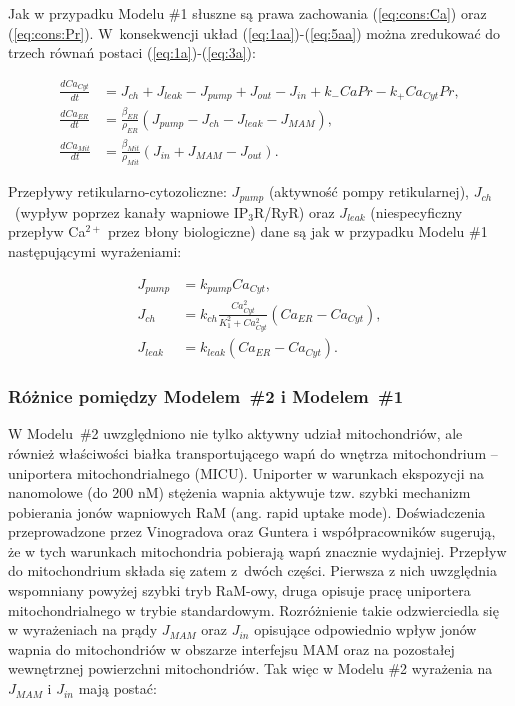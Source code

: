 Jak w przypadku Modelu \#1 słuszne są prawa zachowania 
(\ref{eq:cons:Ca}) oraz (\ref{eq:cons:Pr}). 
W~konsekwencji układ (\ref{eq:1aa})-(\ref{eq:5aa}) można zredukować 
do trzech równań postaci (\ref{eq:1a})-(\ref{eq:3a}): 

\begin{align}
\frac{dCa_{Cyt}}{dt}&=J_{ch}+J_{leak}-J_{pump}+J_{out}-J_{in}
			+k_-CaPr-k_+Ca_{Cyt}Pr, \label{eq:11}\\
\frac{dCa_{ER}}{dt}&=\frac{\beta_{ER}}{\rho_{ER}}\left(J_{pump}-J_{ch}
			-J_{leak} -J_{MAM}\right), \label{eq:22}\\
\frac{dCa_{Mit}}{dt}&=\frac{\beta_{Mit}}{\rho_{Mit}}\left(J_{in}+J_{MAM}
			-J_{out}\right). \label{eq:33}
\end{align}



Przepływy retikularno-cytozoliczne: $J_{pump}$ (aktywność pompy retikularnej), $J_{ch}$~(wypływ poprzez kanały wapniowe IP$_3$R/RyR) oraz $J_{leak}$ (niespecyficzny przepływ Ca$^{2+}$ przez błony biologiczne) dane są jak w przypadku Modelu \#1 następującymi wyrażeniami:

\begin{align}
J_{pump}& = k_{pump}Ca_{Cyt},\\
J_{ch}& = k_{ch}\frac{Ca_{Cyt}^2}{K_1^2+Ca_{Cyt}^2}
											\left(Ca_{ER}-Ca_{Cyt}\right),\label{eq:jch}\\
J_{leak}& = k_{leak}\left(Ca_{ER}-Ca_{Cyt}\right).
\end{align}


\subsubsection*{Różnice pomiędzy Modelem~\#2 i Modelem~\#1}
\label{ss:roznice}

W Modelu~\#2 uwzględniono nie tylko aktywny udział mitochondriów, ale również właściwości białka transportującego wapń do wnętrza mitochondrium – uniportera mitochondrialnego (MICU). Uniporter w warunkach ekspozycji na nanomolowe (do 200 nM) stężenia wapnia aktywuje tzw. szybki mechanizm pobierania jonów wapniowych RaM (ang. rapid uptake mode). Doświadczenia przeprowadzone przez Vinogradova \cite{Vinogradov1973} oraz Guntera i współpracowników \cite{Gunter2001,Sparagna1995} sugerują, że w tych warunkach mitochondria pobierają wapń znacznie wydajniej. Przepływ do mitochondrium składa się zatem z~dwóch części. Pierwsza z nich uwzględnia wspomniany powyżej szybki tryb RaM-owy, druga opisuje pracę uniportera mitochondrialnego w trybie standardowym. Rozróżnienie takie odzwierciedla się w wyrażeniach na prądy $J_{MAM}$ oraz $J_{in}$ opisujące odpowiednio wpływ jonów wapnia do mitochondriów w obszarze interfejsu MAM oraz na pozostałej wewnętrznej powierzchni mitochondriów. Tak więc w Modelu \#2 wyrażenia na $J_{MAM}$ i $J_{in}$ mają postać:

